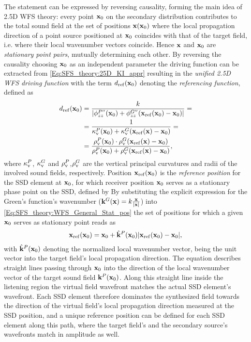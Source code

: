 The statement can be expressed by reversing causality, forming the main idea of 2.5D WFS theory: 
every point $\mathbf{x}_0$ on the secondary distribution contributes to the total sound field at the set of positions $\mathbf{x}(\mathbf{x}_0)$ where the local propagation direction of a point source positioned at $\mathbf{x}_0$ coincides with that of the target field, i.e. where their local wavenumber vectors coincide.
Hence $\mathbf{x}$ and $\mathbf{x}_0$ are \emph{stationary point pairs}, mutually determining each other.
By reversing the causality choosing $\mathbf{x}_0$ as an independent parameter the driving function can be extracted from \eqref{Eq:SFS_theory:25D_KI_appr} resulting in the \emph{unified 2.5D WFS driving function}
with the term $d_{\mathrm{ref}}(\mathbf{x}_0)$ denoting the \emph{referencing function}, defined as
\begin{align}
\label{Eq:SFS_theory:Referencing function}
d_{\mathrm{ref}}(\mathbf{x}_0) &= \frac{k}{|\phi^{P''}_{zz}(\mathbf{x}_0) +\phi^{G''}_{zz}(\mathbf{x}_{\mathrm{ref}}(\mathbf{x}_0)-\mathbf{x}_0)|} =\\
		 	&= \frac{1}{\kappa_\mathrm{v}^P(\mathbf{x}_0)+ \kappa_\mathrm{v}^G(\mathbf{x}_{\mathrm{ref}}(\mathbf{x})-\mathbf{x}_0)}  = \\
			&= \frac{\rho_\mathrm{v}^P(\mathbf{x}_0) \cdot \rho_\mathrm{v}^G(\mathbf{x}_{\mathrm{ref}}(\mathbf{x})-\mathbf{x}_0)}{\rho_\mathrm{v}^P(\mathbf{x}_0)+ \rho_\mathrm{v}^G(\mathbf{x}_{\mathrm{ref}}(\mathbf{x})-\mathbf{x}_0)} 
,
\end{align}
where $\kappa_\mathrm{v}^P$, $\kappa_\mathrm{v}^G$ and $\rho_\mathrm{v}^P$,$\rho_\mathrm{v}^G$ are the vertical principal curvatures and radii of the involved sound fields, respectively.
Position $\mathbf{x}_{\mathrm{ref}}(\mathbf{x}_0)$ is the \emph{reference position} for the SSD element at $\mathbf{x}_0$, for which receiver position $\mathbf{x}_0$ serves as a stationary phase point on the SSD, defined by
By substituting the explicit expression for the Green's function's wavenumber ($\mathbf{k}^G(\mathbf{x}) = k\frac{\mathbf{x}}{|\mathbf{x}|}$) into \eqref{Eq:SFS_theory:WFS_General_Stat_pos} the set of positions for which a given $\mathbf{x}_0$ serves as stationary point reads as 
\begin{align} 
\mathbf{x}_{\mathrm{ref}}(\mathbf{x}_0) = \mathbf{x}_0 + \hat{\mathbf{k}}^P(\mathbf{x}_0) |\mathbf{x}_{\mathrm{ref}}(\mathbf{x}_0)-\mathbf{x}_0|,
\label{Eq:SFS_theory:SSD_ref_positions}
\end{align} 
with $\hat{\mathbf{k}}^P(\mathbf{x}_0)$ denoting the normalized local wavenumber vector, being the unit vector into the target field's local propagation direction.
The equation describes straight lines passing through $\mathbf{x}_0$ into the direction of the local wavenumber vector of the target sound field $\mathbf{k}^P(\mathbf{x}_0)$.
Along this straight line inside the listening region the virtual field wavefront matches the actual SSD element's wavefront.
Each SSD element therefore dominates the synthesized field towards the direction of the virtual field's local propagation direction measured at the SSD position, and a unique reference position can be defined for each SSD element along this path, where the target field's and the secondary source's wavefronts match in amplitude as well.

